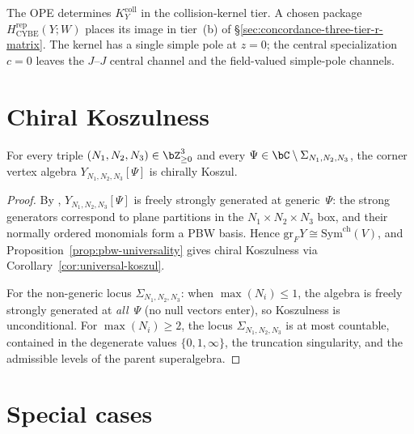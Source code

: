 \begin{remark}%
\label{rem:y111-r-tier}
The OPE determines $K_Y^{\mathrm{coll}}$ in the collision-kernel
tier.  A chosen package $H_{\mathrm{CYBE}}^{\mathrm{rep}}(Y;W)$
places its image in tier~(b) of
\S\ref{sec:concordance-three-tier-r-matrix}.  The kernel has a single
simple pole at $z=0$; the central specialization $c=0$ leaves the
$J$--$J$ central channel and the field-valued simple-pole channels.
\end{remark}


\section{Chiral Koszulness}%
\label{sec:y-koszulness-chapter}

\begin{theorem}%
\label{thm:y-koszulness}
For every triple $(N_1, N_2, N_3) \in \bZ_{\geq 0}^3$ and
every $\Psi \in \bC \setminus \Sigma_{N_1,N_2,N_3}$,
the corner vertex algebra $Y_{N_1,N_2,N_3}[\Psi]$ is
chirally Koszul.
\end{theorem}

\begin{proof}
By \cite[Theorem~3.1]{gaiotto-rapchak},
$Y_{N_1,N_2,N_3}[\Psi]$ is freely strongly generated at
generic~$\Psi$: the strong generators correspond to plane
partitions in the $N_1 \times N_2 \times N_3$ box, and
their normally ordered monomials form a PBW basis. Hence
$\mathrm{gr}_F Y \cong \mathrm{Sym}^{\mathrm{ch}}(V)$, and
Proposition~\ref{prop:pbw-universality} gives chiral Koszulness
via Corollary~\ref{cor:universal-koszul}.

For the non-generic locus $\Sigma_{N_1,N_2,N_3}$: when
$\max(N_i) \leq 1$, the algebra is freely strongly generated
at \emph{all}~$\Psi$ (no null vectors enter), so Koszulness is
unconditional. For $\max(N_i) \geq 2$, the locus
$\Sigma_{N_1,N_2,N_3}$ is at most countable, contained in the
degenerate values $\{0, 1, \infty\}$, the truncation singularity,
and the admissible levels of the parent superalgebra.
\end{proof}


\section{Special cases}%
\label{sec:y-special-cases}

